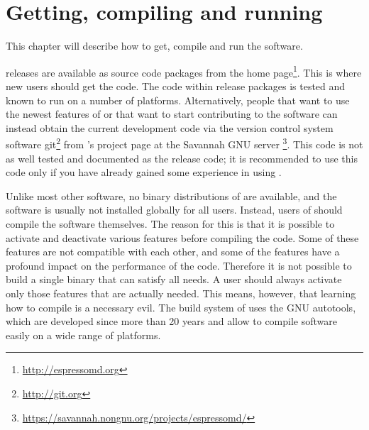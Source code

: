 %  
%   
%  
%  
%
\chapter{Getting, compiling and running \es}
\label{chap:install}

This chapter will describe how to get, compile and run the \es
software.  

\es releases are available as source code packages from the \es home
page\footnote{\url{http://espressomd.org}}.  This is where new users
should get the code.  The code within release packages is tested and
known to run on a number of platforms.  Alternatively, people that
want to use the newest features of \es or that want to start
contributing to the software can instead obtain the current
development code via the version control system software
\textsf{git}\footnote{\url{http://git.org}} from \es's project page at
the Savannah GNU server
\footnote{\url{https://savannah.nongnu.org/projects/espressomd/}}.
This code is not as well tested and documented as the release code; it
is recommended to use this code only if you have already gained some
experience in using \es.

Unlike most other software, no binary distributions of \es are
available, and the software is usually not installed globally for all
users.  Instead, users of \es should compile the software themselves.
 The reason for this is that it is possible to
activate and deactivate various features before compiling the code.
Some of these features are not compatible with each other, and some of
the features have a profound impact on the performance of the code.
Therefore it is not possible to build a single binary that can satisfy
all needs.  A user should always activate only those features that are
actually needed.  This means, however, that learning how to compile
\es is a necessary evil.  The build system of \es uses the GNU
autotools, which are developed since more than 20 years and allow to
compile software easily on a wide range of platforms.

